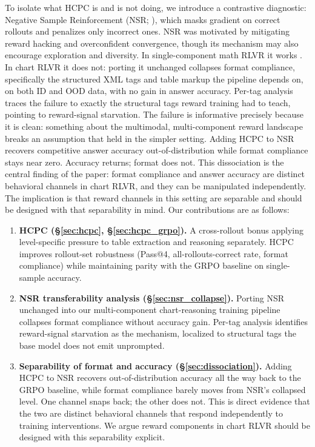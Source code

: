 \documentclass[11pt]{article}
\begin{document}
To isolate what HCPC is and is not doing, we introduce a
contrastive diagnostic: Negative Sample Reinforcement (NSR;
\citealp{zhu2025nsr}), which masks gradient on correct rollouts and
penalizes only incorrect ones. NSR was motivated by mitigating
reward hacking and overconfident convergence, though its mechanism
may also encourage exploration and diversity. In single-component
math RLVR it works \citep{zhu2025nsr}. In chart RLVR it does not:
porting it unchanged collapses format compliance, specifically the
structured XML tags and table markup the pipeline depends on, on
both ID and OOD data, with no gain in answer accuracy. Per-tag
analysis traces the failure to exactly the structural tags reward
training had to teach, pointing to reward-signal starvation. The
failure is informative precisely because it is clean: something
about the multimodal, multi-component reward landscape breaks an
assumption that held in the simpler setting. Adding HCPC to NSR recovers competitive answer accuracy
out-of-distribution while format compliance stays near zero.
Accuracy returns; format does not. This dissociation is the central
finding of the paper: format compliance and answer accuracy are
distinct behavioral channels in chart RLVR, and they can be
manipulated independently. The implication is that reward channels
in this setting are separable and should be designed with that
separability in mind. Our contributions are as follows:
\begin{enumerate}
    \item \textbf{HCPC (\S\ref{sec:hcpc}, \S\ref{sec:hcpc_grpo}).}
    A cross-rollout bonus applying level-specific pressure to table
    extraction and reasoning separately. HCPC improves rollout-set
    robustness (Pass@4, all-rollouts-correct rate, format
    compliance) while maintaining parity with the GRPO baseline on
    single-sample accuracy.
    \item \textbf{NSR transferability analysis
    (\S\ref{sec:nsr_collapse}).} Porting NSR unchanged into our
    multi-component chart-reasoning training pipeline collapses
    format compliance without accuracy gain. Per-tag analysis
    identifies reward-signal starvation as the mechanism, localized
    to structural tags the base model does not emit unprompted.
    \item \textbf{Separability of format and accuracy
    (\S\ref{sec:dissociation}).} Adding HCPC to NSR recovers
    out-of-distribution accuracy all the way back to the GRPO
    baseline, while format compliance barely moves from NSR's
    collapsed level. One channel snaps back; the other does not.
    This is direct evidence that the two are distinct behavioral
    channels that respond independently to training interventions.
    We argue reward components in chart RLVR should be designed
    with this separability explicit.
\end{enumerate}
\end{document}
